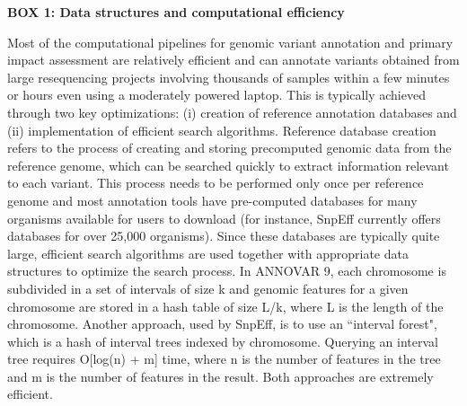 \textbf{BOX 1: Data structures and computational efficiency}
\begin{framed}
Most of the computational pipelines for genomic variant annotation and primary impact assessment are relatively efficient and can annotate variants obtained from large resequencing projects involving thousands of samples within a few minutes or hours even using a moderately powered laptop. This is typically achieved through two key optimizations: (i) creation of reference annotation databases and (ii) implementation of efficient search algorithms. Reference database creation refers to the process of creating and storing precomputed genomic data from the reference genome, which can be searched quickly to extract information relevant to each variant. This process needs to be performed only once per reference genome and most annotation tools have pre-computed databases for many organisms available for users to download (for instance, SnpEff currently offers databases for over 25,000 organisms). Since these databases are typically quite large, efficient search algorithms are used together with appropriate data structures to optimize the search process. In ANNOVAR 9, each chromosome is subdivided in a set of intervals of size k and genomic features for a given chromosome are stored in a hash table of size L/k, where L is the length of the chromosome. Another approach, used by SnpEff, is to use an ``interval forest", which is a hash of interval trees  \cite{cormen2001introduction} indexed by chromosome. Querying an interval tree requires O[log(n) + m] time, where n is the number of features in the tree and m is the number of features in the result. Both approaches are extremely efficient.
\end{framed}

